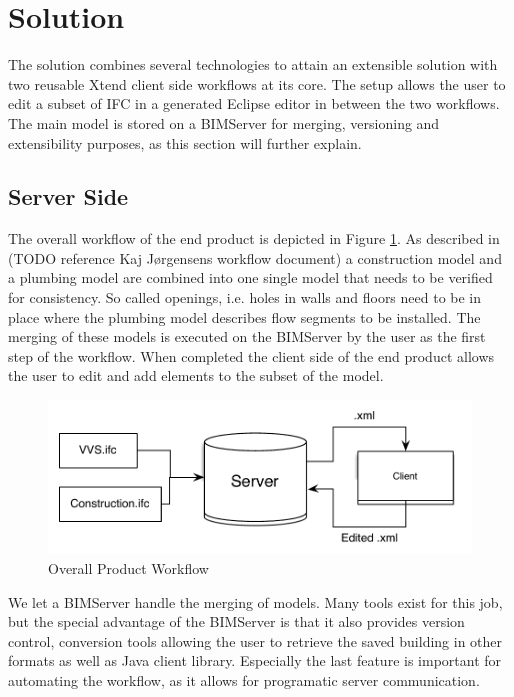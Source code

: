 \section{Solution}
The solution combines several technologies to attain an extensible solution with two reusable Xtend client side workflows at its core. The setup allows the user to edit a subset of IFC in a generated Eclipse editor in between the two workflows. The main model is stored on a BIMServer for merging, versioning and extensibility purposes, as this section will further explain.

\subsection{Server Side}
The overall workflow of the end product is depicted in Figure \ref{fig:overall_product_workflow}. As described in (TODO reference Kaj Jørgensens workflow document) a construction model and a plumbing model are combined into one single model that needs to be verified for consistency. So called openings, i.e. holes in walls and floors need to be in place where the plumbing model describes flow segments to be installed. The merging of these models is executed on the BIMServer by the user as the first step of the workflow. When completed the client side of the end product allows the user to edit and add elements to the subset of the model.

\begin{figure}[htbp]
    \centering
        \includegraphics[width=120mm]{images/CompleteWorkflow.pdf}
    \caption{Overall Product Workflow}
    \label{fig:overall_product_workflow}
\end{figure}

We let a BIMServer handle the merging of models. Many tools exist for this job, but the special advantage of the BIMServer is that it also provides version control, conversion tools allowing the user to retrieve the saved building in other formats as well as Java client library. Especially the last feature is important for automating the workflow, as it allows for programatic server communication.

